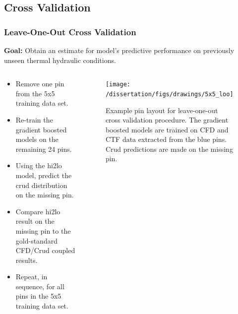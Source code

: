 \documentclass[t, pdftex]{beamer}
\begin{document}
\subsection*{Cross Validation}
\begin{frame}
\frametitle{Leave-One-Out Cross Validation}
\vspace{-8pt}
\textbf{Goal:} Obtain an estimate for model's predictive performance on previously unseen thermal hydraulic conditions.
\begin{columns}
    \begin{column}{0.5\textwidth}
        \scriptsize{
\begin{itemize}
    \item Remove one pin from the 5x5 training data set.
    \item Re-train the gradient boosted models on the remaining 24 pins.
    \item Using the hi2lo model, predict the crud distribution on the missing pin.
    \item Compare hi2lo result on the missing pin to the gold-standard CFD/Crud coupled results.
    \item Repeat, in sequence, for all pins in the 5x5 training data set.
\end{itemize}
}
    \end{column}
\begin{column}{0.5\textwidth}
 
\begin{figure}[h]
    \centering
    \texttt{[image: /dissertation/figs/drawings/5x5\_loo]}
    \caption{ \scriptsize Example pin layout for leave-one-out cross validation procedure.  The gradient boosted models are trained on CFD and CTF data extracted from the blue pins.  Crud predictions are made on the missing pin.}
    \label{fig:5x5loo}
\end{figure}

\end{column}
\end{columns}
\end{frame}


\end{document}
